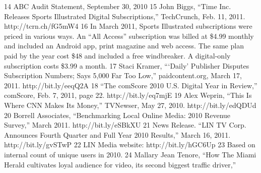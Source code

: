 14 ABC Audit Statement, September 30, 2010
15 John Biggs, ``Time Inc. Releases Sports Illustrated Digital Subscriptions,'' TechCrunch,
Feb. 11, 2011. http://tcrn.ch/fG5mW4
16 In March 2011, Sports Illustrated subscriptions were priced in various ways. An ``All Access''
subscription was billed at \$4.99 monthly and included an Android app, print magazine and
web access. The same plan paid by the year cost \$48 and included a free windbreaker.
A digital-only subscription costs \$3.99 a month.
17 Staci Kramer, ``‘Daily’ Publisher Disputes Subscription Numbers; Says 5,000 Far Too Low,''
paidcontent.org, March 17, 2011. http://bit.ly/eeqQ2A
18 ``The comScore 2010 U.S. Digital Year in Review,'' comScore, Feb. 7, 2011, page 22.
http://bit.ly/eq7mjE
19 Alex Weprin, ``This Is Where CNN Makes Its Money,'' TVNewser, May 27, 2010.
http://bit.ly/edQDUd
20 Borrell Associates, ``Benchmarking Local Online Media: 2010 Revenue Survey,'' March 2011.
http://bit.ly/eSBkXU
21 News Release. ``LIN TV Corp. Announces Fourth Quarter and Full Year 2010 Results,''
March 16, 2011. http://bit.ly/gvSTwP
22 LIN Media website: http://bit.ly/hGC6Up
23 Based on internal count of unique users in 2010.
24 Mallary Jean Tenore, ``How The Miami Herald cultivates loyal audience for video, its second
biggest traffic driver,''


